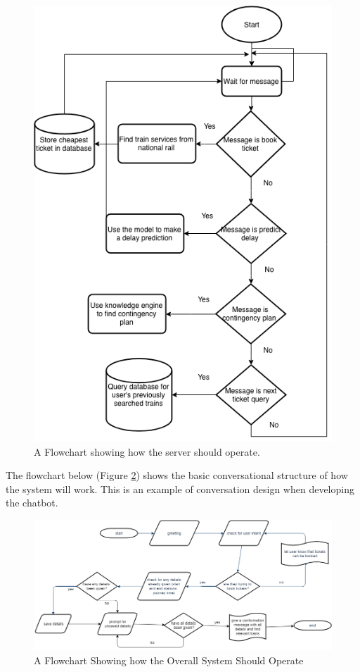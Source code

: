 \documentclass[12pt,a4paper]{article}
\begin{document}
    \begin{figure}[H]
        \centering
        \includegraphics[scale=0.7]{Images/server_flowchart.png}
        \caption{A Flowchart showing how the server should operate.}
        \label{fig:server_flowchat}
    \end{figure}
    
    The flowchart below (Figure \ref{fig:overall_flowchart}) shows the basic conversational structure of how the system will work. This is an example of conversation design when developing the chatbot.
    
    \begin{figure}[H]
        \centering
        \includegraphics[scale=0.4]{Images/flowchart_overall.png}
        \caption{A Flowchart Showing how the Overall System Should Operate}
        \label{fig:overall_flowchart}
    \end{figure}
    
\end{document}
